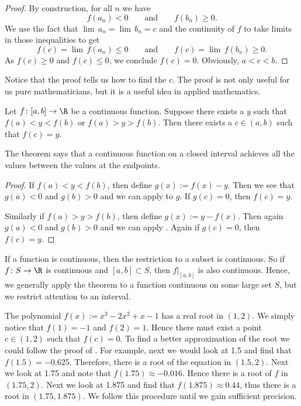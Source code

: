 \documentclass[12pt]{book}
\begin{document}
\begin{proof}
By construction, for all $n$ we have
\begin{equation*}
f(a_n) < 0
\qquad \text{and} \qquad
f(b_n) \geq 0 .
\end{equation*}
We use the fact that
$\lim\, a_n = \lim\, b_n = c$
and 
the continuity of $f$ to take limits in those inequalities to get
\begin{equation*}
f(c) = \lim\, f(a_n) \leq 0
\qquad \text{and} \qquad
f(c) = \lim\, f(b_n) \geq 0 .
\end{equation*}
As $f(c) \geq 0$ and 
$f(c) \leq 0$, we conclude $f(c) = 0$.
Obviously, $a < c < b$.
\end{proof}

Notice that
the proof tells us how to find the $c$.
The
proof is not only useful for us pure mathematicians,
but it is a useful idea in applied mathematics.

\begin{thm} \label{IVT:thm}
Let $f \colon [a,b] \to \R$ be a continuous function.
Suppose there exists a $y$ such that $f(a) < y < f(b)$
or $f(a) > y > f(b)$.
Then there exists a $c \in (a,b)$
such that $f(c) = y$.
\end{thm}

The theorem says that a continuous function on a closed interval
achieves all the values between the values at the endpoints.

\begin{proof}
If $f(a) < y < f(b)$, then define $g(x) := f(x)-y$.
Then we see
that $g(a) < 0$ and $g(b) > 0$ and we can apply 
to $g$.
If $g(c) = 0$, then $f(c) = y$.

Similarly if $f(a) > y > f(b)$, then define $g(x) := y-f(x)$.
Then
again $g(a) < 0$ and $g(b) > 0$ and we can apply .
Again if $g(c) = 0$, then $f(c) = y$.
\end{proof}

If a function is continuous, then the restriction
to a subset is continuous.
So if $f \colon S \to \R$ is continuous and
$[a,b] \subset S$, then $f|_{[a,b]}$ is also continuous.
Hence, we generally
apply the theorem to a function continuous on some large set $S$,
but we restrict attention to an interval.

\begin{example}
The polynomial $f(x) := x^3-2x^2+x-1$ has a real root in $(1,2)$.
We simply
notice that $f(1) = -1$ and $f(2) = 1$.
Hence there must exist a point $c
\in (1,2)$ such that $f(c) = 0$.
To find a better approximation of
the root we could follow the proof of .
For example,
next we would look at 1.5 and find that $f(1.5) = -0.625$.
Therefore,
there is a root of the equation in $(1.5,2)$.
Next we look at 1.75
and note that $f(1.75) \approx -0.016$.
Hence there is a root of $f$ in
$(1.75,2)$.
Next we look at 1.875 and find that $f(1.875) \approx 0.44$,
thus there is a root in $(1.75,1.875)$.
We follow this procedure until we gain
sufficient precision.
\end{example}
\end{document}
